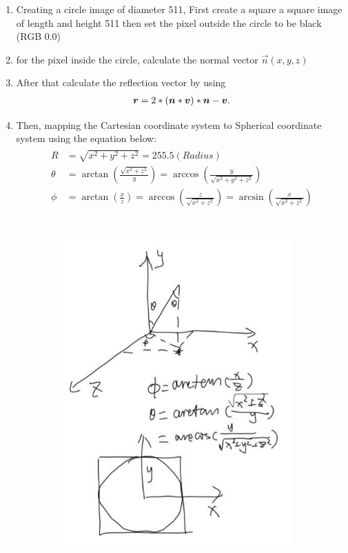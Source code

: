 \documentclass[12pt,twoside]{article}
\begin{document}
    \begin{enumerate}[1)]
        \item Creating a circle image of diameter 511, First create a square a square image of length and height 511 then set the pixel outside the circle to be black (RGB 0.0) 
        \item for the pixel inside the circle, calculate the normal vector  $\vec{n}(x,y,z)$
        \item After that calculate the reflection vector by using \\
         \begin{align} 
            {\boldsymbol{{r}}} = 2*({\boldsymbol{{n}}} * {\boldsymbol{{v}}})*{\boldsymbol{{n}}} - {\boldsymbol{{v}}}. 
        \end{align}
        \item Then, mapping the Cartesian coordinate system to Spherical coordinate system using the equation below:
        \begin{align} 
            \begin{aligned} R & = \sqrt { x ^ { 2 } + y ^ { 2 } + z ^ { 2 } } = 255.5 (Radius)
            \\ \theta & = \arctan \left( \frac { \sqrt { x ^ { 2 } + z ^ { 2 } } } { y } \right) = \arccos \left( \frac { y } { \sqrt { x ^ { 2 } + y ^ { 2 } + z ^ { 2 } } } \right) \\ \phi & = \arctan \left( \frac { x } { z } \right) = \arccos \left( \frac { z } { \sqrt { x ^ { 2 } + z ^ { 2 } } } \right) = \arcsin \left( \frac { x } { \sqrt { x ^ { 2 } + z ^ { 2 } } } \right) \end{aligned}
        \end{align}\\
    \begin{figure}[H]
        \centering %
        \includegraphics[width=10cm, height=12cm]{./figures/Capture.JPG} %

\end{figure}
\end{enumerate}
\end{document}
